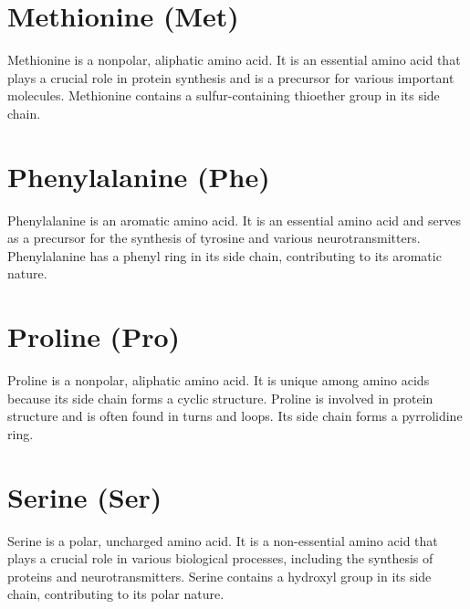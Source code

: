 \documentclass{article}
\begin{document}
\section*{Methionine (Met)}
Methionine is a nonpolar, aliphatic amino acid. It is an essential amino acid that plays a crucial role in protein synthesis and is a precursor for various important molecules. Methionine contains a sulfur-containing thioether group in its side chain.
\begin{center}
\end{center}

\section*{Phenylalanine (Phe)}
Phenylalanine is an aromatic amino acid. It is an essential amino acid and serves as a precursor for the synthesis of tyrosine and various neurotransmitters. Phenylalanine has a phenyl ring in its side chain, contributing to its aromatic nature.
\begin{center}
\end{center}

\section*{Proline (Pro)}
Proline is a nonpolar, aliphatic amino acid. It is unique among amino acids because its side chain forms a cyclic structure. Proline is involved in protein structure and is often found in turns and loops. Its side chain forms a pyrrolidine ring.
\begin{center}
\end{center}
\section*{Serine (Ser)}
Serine is a polar, uncharged amino acid. It is a non-essential amino acid that plays a crucial role in various biological processes, including the synthesis of proteins and neurotransmitters. Serine contains a hydroxyl group in its side chain, contributing to its polar nature.
\begin{center}
\end{center}
\end{document}
